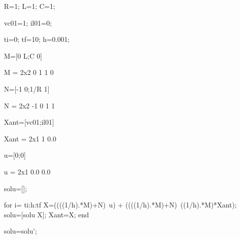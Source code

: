 \documentclass[10pt,a4paper]{article} %
\begin{document}
	\begin{matlabcode}
		R=1;
		L=1;
		C=1;
	\end{matlabcode}
	
	
	\begin{matlabcode}
		vc01=1;
		il01=0;
	\end{matlabcode}
	
	
	\begin{matlabcode}
		ti=0;
		tf=10;
		h=0.001;
	\end{matlabcode}
	
	
	\begin{matlabcode}
		M=[0 L;C 0]
	\end{matlabcode}
	\begin{matlaboutput}
		M = 2x2    
		0     1
		1     0		
	\end{matlaboutput}
	\begin{matlabcode}
		N=[-1 0;1/R 1]
	\end{matlabcode}
	\begin{matlaboutput}
		N = 2x2    
		-1     0
		 1     1		
	\end{matlaboutput}
	\begin{matlabcode}
		Xant=[vc01;il01]
	\end{matlabcode}
	\begin{matlaboutput}
		Xant = 2x1    
		1
		0.0		
	\end{matlaboutput}
	\begin{matlabcode}
		u=[0;0]
	\end{matlabcode}
	\begin{matlaboutput}
		u = 2x1    
		0.0
		0.0		
	\end{matlaboutput}
	\begin{matlabcode}
		solu=[];
	\end{matlabcode}
	
	\begin{matlabcode}
		for i= ti:h:tf
		X=((((1/h).*M)+N)\ u) + ((((1/h).*M)+N)\ ((1/h).*M)*Xant);
		solu=[solu X];
		Xant=X;
		end
	\end{matlabcode}
	
	\vspace{1em}
	
	\begin{matlabcode}
		solu=solu';
	\end{matlabcode}
	
\end{document}
